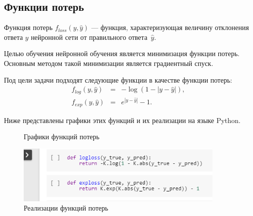 \subsection{Функции потерь}\label{subsec:losses}

\begin{definition}
  Функция потерь $f_{loss}(y, \hat{y})$ --- функция, характеризующая величину отклонения ответа $y$ нейронной сети от правильного ответа~$\hat{y}$.
\end{definition}

Целью обучения нейронной обучения является минимизация функции потерь. Основным методом такой минимизации является градиентный спуск\cite[с.\,151]{bib:neural_networks2}.

Под цели задачи подходят следующие функции в качестве функции потерь:
\begin{eqnarray}
  \nonumber f_{log}(y, \hat{y}) &=& -\log(1 - |y-\hat{y}|), \\
  \nonumber f_{exp}(y, \hat{y}) &=& e^{|y-\hat{y}|} - 1.
\end{eqnarray}

Ниже представлены графики этих функций и их реализации\cite[раздел backend]{bib:keras} на языке Python.
\begin{figure}[h]
\center
{}
\caption{Графики функций потерь}\label{fig:custom_losses}
\end{figure}

\begin{figure}[h]
    \centering
    \includegraphics[width=0.9\textwidth]{losses_python.png}
    \caption{Реализации функций потерь}\label{fig:custom_losses}
    \label{fig:losses_python}
\end{figure}
\newpage
%
